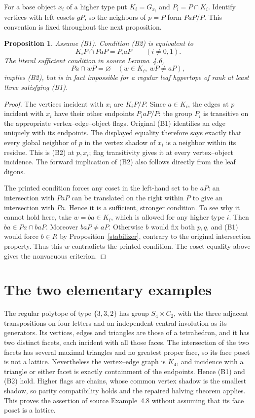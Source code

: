 \documentclass[11pt,a4paper]{article}
\newtheorem{proposition}[theorem]{Proposition}
\begin{document}
For a base object $x_i$ of a higher type put $K_i=G_{x_i}$ and
$P_i=P\cap K_i$. Identify vertices with left cosets $gP$, so
the neighbors of $p=P$ form $PaP/P$. This convention is fixed
throughout the next proposition.

\begin{proposition}\label{B2}
Assume (B1). Condition (B2) is equivalent to
\[
                   K_iP\cap PaP=P_i aP\qquad(i\ne0,1).
\]
The literal sufficient condition in source Lemma~4.6,
\[
 Pa\cap wP=\varnothing\quad
 (w\in K_i,\ wP\ne aP),
\]
implies (B2), but is in fact impossible for a regular leaf hypertope
of rank at least three satisfying (B1).
\end{proposition}
\begin{proof}
The vertices incident with $x_i$ are $K_iP/P$. Since $a\in K_i$,
the edges at $p$ incident with $x_i$ have their other endpoints
$P_i aP/P$: the group $P_i$ is transitive on the appropriate
vertex--edge--object flags. Original (B1) identifies an edge
uniquely with its endpoints. The displayed equality therefore
says exactly that every global neighbor of $p$ in the vertex
shadow of $x_i$ is a neighbor within its residue. This is (B2)
at $p,x_i$; flag transitivity gives it at every vertex--object
incidence. The forward implication of (B2) also follows directly
from the leaf digons.

The printed condition forces any coset in the left-hand set to
be $aP$: an intersection with $PaP$ can be translated on the
right within $P$ to give an intersection with $Pa$. Hence it is
a sufficient, stronger condition. To see why it cannot hold here,
take $w=ba\in K_i$, which is allowed for any higher type $i$.
Then $ba\in Pa\cap baP$. Moreover $baP\ne aP$. Otherwise $b$
would fix both $p,q$, and (B1) would force $b\in R$ by
Proposition~\ref{stabilizer}, contrary to the original intersection
property. Thus this $w$ contradicts the printed condition. The
coset equality above gives the nonvacuous criterion.
\end{proof}

\section{The two elementary examples}
The regular polytope of type $\{3,3,2\}$ has group $S_4\times C_2$,
with the three adjacent transpositions on four letters and an independent
central involution as its generators. Its vertices, edges and triangles
are those of a tetrahedron, and it has two distinct facets, each incident
with all those faces. The intersection of the two facets has several
maximal triangles and no greatest proper face, so its face poset is
not a lattice. Nevertheless the vertex--edge graph is $K_4$, and
incidence with a triangle or either facet is exactly containment of
the endpoints. Hence (B1) and (B2) hold. Higher flags are chains,
whose common vertex shadow is the smallest shadow, so parity
compatibility holds and the repaired halving theorem applies.
This proves the assertion of source Example~4.8 without assuming
that its face poset is a lattice.
\end{document}
